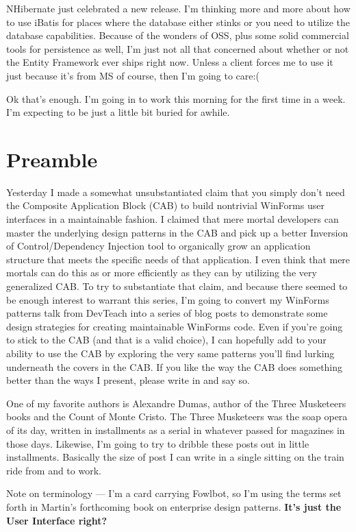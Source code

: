 \documentclass{article}
\begin{document}
{NHibernate just celebrated a new release.  I'm thinking more and more about how to use iBatis for places where the database either stinks or you need to utilize the database capabilities.  Because of the wonders of OSS, plus some solid commercial tools for persistence as well, I'm just not all that concerned about whether or not the Entity Framework ever ships right now.  Unless a client forces me to use it just because it's from MS of course, then I'm going to care:(

Ok that's enough.  I'm going in to work this morning for the first time in a week.  I'm expecting to be just a little bit buried for awhile.


\section { Preamble }

Yesterday I made a somewhat unsubstantiated claim that you simply don't need the Composite Application Block (CAB) to build nontrivial WinForms user interfaces in a maintainable fashion.  I claimed that mere mortal developers can master the underlying design patterns in the CAB and pick up a better Inversion of Control/Dependency Injection tool to organically grow an application structure that meets the specific needs of that application.  I even think that mere mortals can do this as or more efficiently as they can by utilizing the very generalized CAB.  To try to substantiate that claim, and because there seemed to be enough interest to warrant this series, I'm going to convert my WinForms patterns talk from DevTeach into a series of blog posts to demonstrate some design strategies for creating maintainable WinForms code.  Even if you're going to stick to the CAB (and that is a valid choice), I can hopefully add to your ability to use the CAB by exploring the very same patterns you'll find lurking underneath the covers in the CAB.  If you like the way the CAB does something better than the ways I present, please write in and say so.

One of my favorite authors is Alexandre Dumas, author of the Three Musketeers books and the Count of Monte Cristo.  The Three Musketeers was the soap opera of its day, written in installments as a serial in whatever passed for magazines in those days.  Likewise, I'm going to try to dribble these posts out in little installments.  Basically the size of post I can write in a single sitting on the train ride from and to work.

Note on terminology — I'm a card carrying Fowlbot, so I'm using the terms set forth in Martin's forthcoming book on enterprise design patterns.
\Large {\textbf{It's just the User Interface right?}}

}
\end{document}
